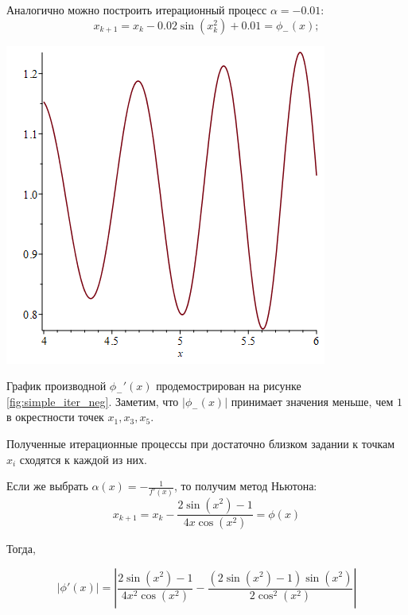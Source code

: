 \documentclass[a4paper, fontsize=14pt]{article}
\begin{document}
Аналогично можно построить итерационный процесс $\alpha = - 0.01$:
\begin{equation}
    x_{k+1} = x_{k} - 0.02 \sin(x^2_k) + 0.01 = \phi_{-}(x);
\end{equation}

\begin{center}
    \includegraphics[scale=0.6]{src/simple_iter_neg.png}
    \label{fig:simple_iter_neg}
\end{center}

График производной $\phi_{-}'(x)$ продемострирован на рисунке \ref{fig:simple_iter_neg}. Заметим, что $|\phi_{-}(x)|$ принимает значения меньше, чем $1$ в окрестности точек $x_1, x_3, x_5$.

Полученные итерационные процессы при достаточно близком задании к точкам $x_i$ сходятся к каждой из них.

Если же выбрать $\alpha(x) = - \frac{1}{f'(x)}$, то получим метод Ньютона:
\begin{equation}
    x_{k+1} = x_k - \frac{2 \sin(x^2) - 1}{4 x \cos(x^2)} = \phi(x)
\end{equation}

Тогда, 

\begin{equation}
    \label{eq:newton_phi_prime}
    |\phi'(x)| = \left| \frac{2 \sin(x^2) - 1}{4 x^2 \cos(x^2)} - \frac{(2 \sin(x^2) - 1) \sin(x^2)}{2 \cos^2(x^2)} \right|
\end{equation}
\end{document}
